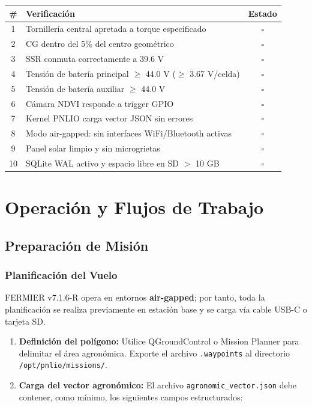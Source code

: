 \begin{table}[h]
\centering
\begin{tabular}{|c|p{10cm}|c|}
\hline
\textbf{\#} & \textbf{Verificación} & \textbf{Estado} \\ \hline
1 & Tornillería central apretada a torque especificado & $\square$ \\ \hline
2 & CG dentro del 5\% del centro geométrico & $\square$ \\ \hline
3 & SSR conmuta correctamente a 39.6 V & $\square$ \\ \hline
4 & Tensión de batería principal $\geq$ 44.0 V ($\geq$ 3.67 V/celda) & $\square$ \\ \hline
5 & Tensión de batería auxiliar $\geq$ 44.0 V & $\square$ \\ \hline
6 & Cámara NDVI responde a trigger GPIO & $\square$ \\ \hline
7 & Kernel PNLIO carga vector JSON sin errores & $\square$ \\ \hline
8 & Modo air-gapped: sin interfaces WiFi/Bluetooth activas & $\square$ \\ \hline
9 & Panel solar limpio y sin microgrietas & $\square$ \\ \hline
10 & SQLite WAL activo y espacio libre en SD $>$ 10 GB & $\square$ \\ \hline
\end{tabular}
\end{table}


\chapter{Operación y Flujos de Trabajo}

\section{Preparación de Misión}

\subsection{Planificación del Vuelo}

FERMIER v7.1.6-R opera en entornos \textbf{air-gapped}; por tanto, toda la planificación se realiza previamente en estación base y se carga vía cable USB-C o tarjeta SD.

\begin{enumerate}
    \item \textbf{Definición del polígono:} Utilice QGroundControl o Mission Planner para delimitar el área agronómica. Exporte el archivo \texttt{.waypoints} al directorio \texttt{/opt/pnlio/missions/}.
    \item \textbf{Carga del vector agronómico:} El archivo \texttt{agronomic\_vector.json} debe contener, como mínimo, los siguientes campos estructurados:
\end{enumerate}

